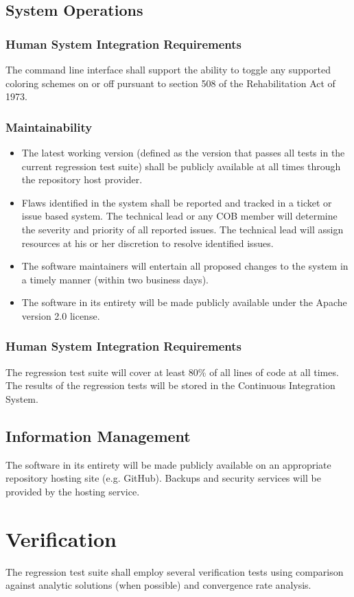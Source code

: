 \subsection{System Operations}
\subsubsection{Human System Integration Requirements}
The command line interface shall support the ability to toggle any supported coloring schemes on or off pursuant to section
508 of the Rehabilitation Act of 1973.
\subsubsection{Maintainability}
\begin{itemize}
  \item The latest working version (defined as the version that passes all tests in the current regression test suite) shall be
           publicly available at all times through the repository host provider.
  \item  Flaws identified in the system shall be reported and tracked in a ticket or issue based system. The technical lead or
            any COB member will
            determine the severity and priority of all reported issues. The technical lead will assign resources at his or her
            discretion to resolve identified issues.
  \item  The software maintainers will entertain all proposed changes to the system in a timely manner
           (within two business days).
  \item  The software in its entirety will be made publicly available under the Apache version 2.0 license.
\end{itemize}
\subsubsection{Human System Integration Requirements}
The regression test suite will cover at least 80\% of all lines of code at all times.
The results of the regression tests will be stored in the Continuous Integration System.

\subsection{Information Management}
The software in its entirety will be made publicly available on an appropriate repository hosting site (e.g. GitHub).
Backups and security services will be provided by the hosting service.

\section{Verification}
The regression test suite shall employ several verification tests using comparison against analytic
solutions (when possible) and convergence rate analysis.
